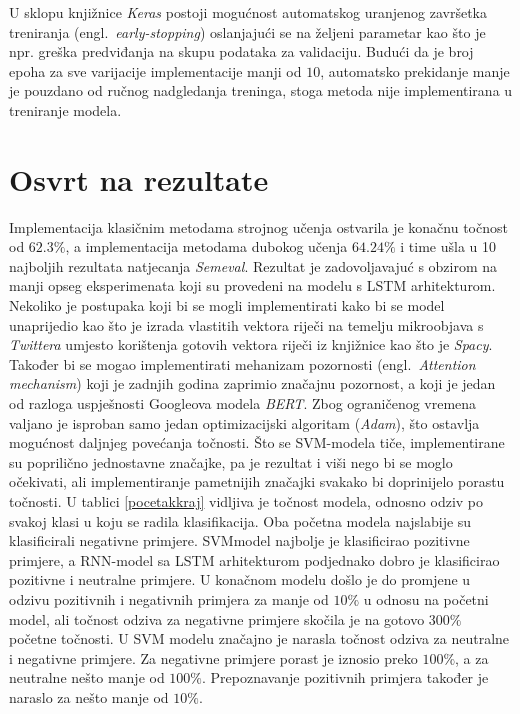 \documentclass[times, utf8, zavrsni]{fer}
\begin{document}
U sklopu knjižnice \emph{Keras} postoji mogućnost automatskog uranjenog završetka treniranja (engl.~\emph{early-stopping}) oslanjajući se na željeni parametar kao što je npr. greška predviđanja na skupu podataka za validaciju. Budući da je broj epoha za sve varijacije implementacije manji od $10$, automatsko prekidanje manje je pouzdano od ručnog nadgledanja treninga, stoga metoda nije implementirana u treniranje modela.

\section{Osvrt na rezultate}

Implementacija klasičnim metodama strojnog učenja ostvarila je konačnu točnost od $62.3\%$, a implementacija metodama dubokog učenja $64.24\%$ i time ušla u 10 najboljih rezultata natjecanja \emph{Semeval}. Rezultat je zadovoljavajuć s obzirom na manji opseg eksperimenata koji su provedeni na modelu s \gls{LSTM} arhitekturom. Nekoliko je postupaka koji bi se mogli implementirati kako bi se model unaprijedio kao što je izrada vlastitih vektora riječi na temelju mikroobjava s \emph{Twittera} umjesto korištenja gotovih vektora riječi iz knjižnice kao što je \emph{Spacy}. Također bi se mogao implementirati mehanizam pozornosti (engl.~\emph{Attention mechanism}) koji je zadnjih godina zaprimio značajnu pozornost, a koji je jedan od razloga uspješnosti Googleova modela \emph{BERT}. Zbog ograničenog vremena valjano je isproban samo jedan optimizacijski algoritam (\emph{Adam}), što ostavlja mogućnost daljnjeg povećanja točnosti. Što se \gls{SVM}-modela tiče, implementirane su poprilično jednostavne značajke, pa je rezultat i viši nego bi se moglo očekivati, ali implementiranje pametnijih značajki svakako bi doprinijelo porastu točnosti. U tablici \ref{pocetakkraj} vidljiva je točnost modela, odnosno odziv po svakoj klasi u koju se radila klasifikacija. Oba početna modela najslabije su klasificirali negativne primjere. \gls{SVM}model najbolje je klasificirao pozitivne primjere, a \gls{RNN}-model sa \gls{LSTM} arhitekturom podjednako dobro je klasificirao pozitivne i neutralne primjere. U konačnom modelu došlo je do promjene u odzivu pozitivnih i negativnih primjera za manje od $10\%$ u odnosu na početni model, ali točnost odziva za negativne primjere skočila je na gotovo $300\%$ početne točnosti. U \gls{SVM} modelu značajno je narasla točnost odziva za neutralne i negativne primjere. Za negativne primjere porast je iznosio preko $100\%$, a za neutralne nešto manje od $100\%$. Prepoznavanje pozitivnih primjera također je naraslo za nešto manje od $10\%$.
\end{document}
